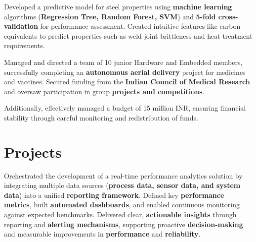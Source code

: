 \documentclass[]{deedy-resume-openfont}
\begin{document}
\begin{minipage}[t]{0.66\textwidth}
\vspace{\topsep} %
\begin{tightemize}
\item Developed a predictive model for steel properties using \textbf{machine learning }algorithms (\textbf{Regression Tree, Random Forest, SVM}) and \textbf{5-fold cross-validation} for performance assessment. Created intuitive features like carbon equivalents to predict properties such as weld joint brittleness and heat treatment requirements.
\end{tightemize}
\sectionsep

\vspace{\topsep} %
\begin{tightemize}
\item Managed and directed a team of 10 junior Hardware and Embedded members, successfully completing an \textbf{autonomous aerial delivery} project for medicines and vaccines. Secured funding from the \textbf{Indian Council of Medical Research} and oversaw participation in group \textbf{projects and competitions}.

\item Additionally, effectively managed a budget of 15 million INR, ensuring financial stability through careful monitoring and redistribution of funds.
\end{tightemize}
\sectionsep

\section{Projects}

\vspace{\topsep}
Orchestrated the development of a real-time performance analytics solution by integrating multiple data sources (\textbf{process data, sensor data, and system data}) into a unified \textbf{reporting framework}. Defined key \textbf{performance metrics}, built \textbf{automated dashboards}, and enabled continuous monitoring against expected benchmarks. Delivered clear, \textbf{actionable insights} through reporting and \textbf{alerting mechanisms}, supporting proactive \textbf{decision-making} and measurable improvements in \textbf{performance} and \textbf{reliability}.
\sectionsep


\end{minipage}
\newpage
\end{document}
